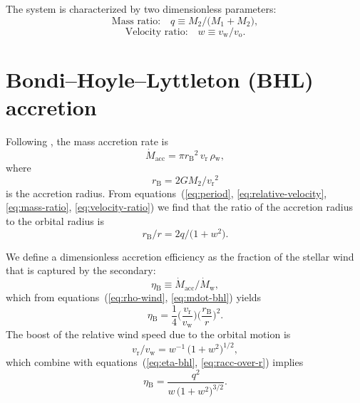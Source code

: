 \documentclass[useAMS, usenatbib, a4paper]{mnras}
\newcommand\wind{\ensuremath{_{\mathrm{w}}}}
\newcommand\mdwind{\ensuremath{\dot M\wind}}
\newcommand\orb{\ensuremath{_{\mathrm{o}}}}
\newcommand\rel{\ensuremath{_{\mathrm{r}}}}
\newcommand\bhl{\ensuremath{_{\mathrm{\scriptscriptstyle B}}}}
\newcommand\acc{\ensuremath{_{\mathrm{acc}}}}
\newcommand\mdacc{\ensuremath{\dot M\acc}}
\begin{document}
The system is characterized by two dimensionless parameters:
\begin{equation}
  \label{eq:mass-ratio}
  \text{Mass ratio:}\quad q \equiv M_2 / \bigl(M_1 + M_2\bigr),
\end{equation}
\begin{equation}
  \label{eq:velocity-ratio}
  \text{Velocity ratio:}\quad w \equiv v\wind / v\orb.
\end{equation}

\section{Bondi--Hoyle--Lyttleton (BHL) accretion}
\label{sec:bondi-hoyle-lyttl}

Following \citet{Hoyle:1939a, Bondi:1944a},
the mass accretion rate is
\begin{equation}
  \label{eq:mdot-bhl}
  \mdacc = \pi r\bhl^2 \, v\rel \, \rho\wind , 
\end{equation}
where
\begin{equation}
  \label{eq:radius-bhl}
  r\bhl = 2 G M_2 / v\rel^2 
\end{equation}
is the accretion radius.
From equations~(\ref{eq:period}, \ref{eq:relative-velocity}, \ref{eq:mass-ratio}, \ref{eq:velocity-ratio}) we find that the ratio of the accretion radius to the orbital radius is
\begin{equation}
  \label{eq:racc-over-r}
  r\bhl / r = 2 q / \bigl(1 + w^2\bigr).
\end{equation}

We define a dimensionless accretion efficiency as the fraction of the stellar wind that is captured by the secondary:
\begin{equation}
  \label{eq:eta-bhl-def}
  \eta\bhl \equiv \mdacc / \mdwind ,
\end{equation}
which from equations~(\ref{eq:rho-wind}, \ref{eq:mdot-bhl}) yields
\begin{equation}
  \label{eq:eta-bhl}
  \eta\bhl = \frac{1}{4}
  \biggl( \frac{v\rel}{v\wind} \biggr)
  \biggl( \frac{r\bhl}{r}\biggr)^2 . 
\end{equation}
The boost of the relative wind speed due to the orbital motion is
\begin{equation}
  \label{eq:boost-ratio}
  v\rel / v\wind =  w^{-1} \, \bigl(1 + w^2\bigr)^{1/2} ,
\end{equation}
which combine with equations~(\ref{eq:eta-bhl}, \ref{eq:racc-over-r}) implies
\begin{equation}
  \label{eq:eta-bhl-dimensionless}
  \eta\bhl = \frac{q^2}{w \, \bigl(1 + w^2\bigr)^{3/2}} .
\end{equation}
\end{document}
